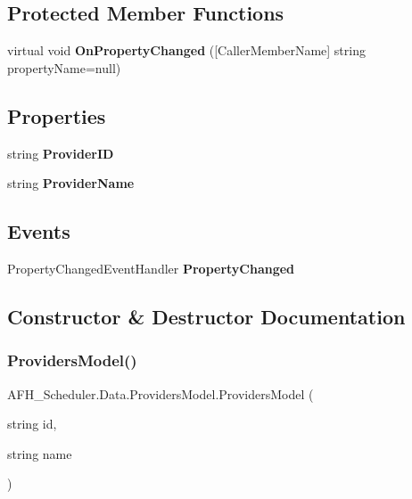 \subsection*{Protected Member Functions}
\begin{DoxyCompactItemize}
\item 
virtual void \textbf{ On\+Property\+Changed} ([Caller\+Member\+Name] string property\+Name=null)
\end{DoxyCompactItemize}
\subsection*{Properties}
\begin{DoxyCompactItemize}
\item 
string \textbf{ Provider\+ID}\hspace{0.3cm}{\ttfamily  [get, set]}
\item 
string \textbf{ Provider\+Name}\hspace{0.3cm}{\ttfamily  [get, set]}
\end{DoxyCompactItemize}
\subsection*{Events}
\begin{DoxyCompactItemize}
\item 
Property\+Changed\+Event\+Handler \textbf{ Property\+Changed}
\end{DoxyCompactItemize}


\subsection{Constructor \& Destructor Documentation}
\mbox{\label{class_a_f_h___scheduler_1_1_data_1_1_providers_model_a9e2747425093e1dfa48018b7b1249418}} 
\subsubsection{ProvidersModel()}
{\footnotesize\ttfamily A\+F\+H\+\_\+\+Scheduler.\+Data.\+Providers\+Model.\+Providers\+Model (\begin{DoxyParamCaption}\item[{string}]{id,  }\item[{string}]{name }\end{DoxyParamCaption})}



